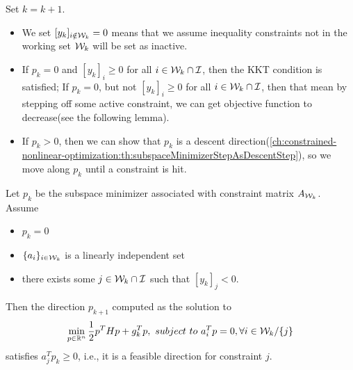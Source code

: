 \begin{refsection}
\begin{algorithm}[H]
{		
		
		Set $k = k+1$.
		
	}
	\caption{Primal active-set method for strictly convex quadratic programming}
\end{algorithm}

\begin{remark}[interpretation]\hfill
\begin{itemize}
	\item We set $[y_k]_{i\notin \mathcal{W}_k} = 0$ means that we assume inequality constraints not in the working set $\mathcal{W}_k$ will be set as inactive.
	\item If $p_k = 0$ and $[y_k]_i \geq 0$ for all $i\in \mathcal{W}_k \cap \mathcal{I}$, then the KKT condition is satisfied; If $p_k = 0$, but not $[y_k]_i \geq 0$ for all $i\in \mathcal{W}_k \cap \mathcal{I}$, then that mean by stepping off some active constraint, we can get objective function to decrease(see the following lemma). 
	\item If $p_k > 0$, then we can show that $p_k$ is a descent direction(\autoref{ch:constrained-nonlinear-optimization:th:subspaceMinimizerStepAsDescentStep}), so we move along $p_k$ until a constraint is hit.
\end{itemize}
\end{remark}

\begin{lemma}\cite[470]{nocedal2006numerical}
	Let $p_k$ be the subspace minimizer associated with constraint matrix $A_{\mathcal{W}_k}$.
	Assume
	\begin{itemize}
		\item $p_k = 0$
		\item $\{a_i\}_{i\in\mathcal{W}_k}$ is a linearly independent set
		\item there exists some $j\in \mathcal{W}_k \cap \mathcal{I}$ such that $[y_k]_j < 0$.
	\end{itemize}
	Then the direction $p_{k+1}$ computed as the solution to
	$$\min_{p\in\mathbb{R}^n} \frac{1}{2}p^THp + g_k^T p, ~subject~to~ a_i^T p = 0 , \forall i\in \mathcal{W}_k / \{j\} $$
	satisfies $a_j^T p_{k} \geq 0$, i.e., it is a feasible direction for constraint $j$. 
	

\end{lemma}
\end{refsection}
